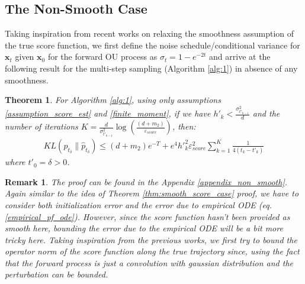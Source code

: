 \documentclass[11pt]{article}
\newcommand{\xh}[1]{\textcolor[HTML]{66CCFF}{#1}}
\def\rvx{{\mathbf{x}}}
\newcommand{\KL}[2]{\mathrm{KL}\left(#1 \big\| #2\right)}
\newtheorem{theorem}[lemma]{Theorem}
\newtheorem{remark}{Remark}
\begin{document}
\subsection{The Non-Smooth Case}
\label{non_smooth_subsec}
\noindent
Taking inspiration from recent works \cite{chen2023improved,benton2024nearly} on relaxing the smoothness assumption of the true score function, we first define the noise schedule/conditional variance for $\rvx_t$ given $\rvx_0$ for the forward OU process as $\sigma_t = 1-e^{-2t}$ and arrive at the following result for the multi-step sampling (Algorithm \ref{alg:1}) in absence of any smoothness. 
\begin{theorem}
\label{thm:non_smooth_3.3}
   For Algorithm \ref{alg:1}, using only assumptions \ref{assumption_score_est} and \ref{finite_moment}, if we have $ {h'}_k < \frac{\sigma^2_{t'_{k-1}}}{d}$ and the number of iterations $K=\frac{d}{\sigma^2_{t'_{k-1}}}\log\left(\frac{(d+m_2)}{\varepsilon_{score}}\right)$, then:
  \begin{align}
KL(p_{t_\delta}\|\hat{p}_{t_\delta}) \leq (d+m_2) e^{-T} +  e^4{h'}_k^2\varepsilon^2_{score} \sum_{k=1}^K\frac{1}{4{(t_k-{t'}_k)}}
  \end{align}
where $t'_0 = \delta > 0$.
\end{theorem}

\begin{remark}
The proof can be found in the Appendix \ref{appendix_non_smooth}. Again similar to the idea of Theorem \ref{thm:smooth_score_case} proof, we have to consider both initialization error and the error due to empirical ODE (eq. \ref{empirical_pf_ode}). However, since the score function hasn't been provided as smooth here, bounding the error due to the empirical ODE will be a bit more tricky here. Taking inspiration from the previous works, we first try to bound the operator norm of the score function along the true trajectory since, using the fact that the forward process is just a convolution with gaussian distribution and the perturbation can be bounded. 
\end{remark}
\end{document}
